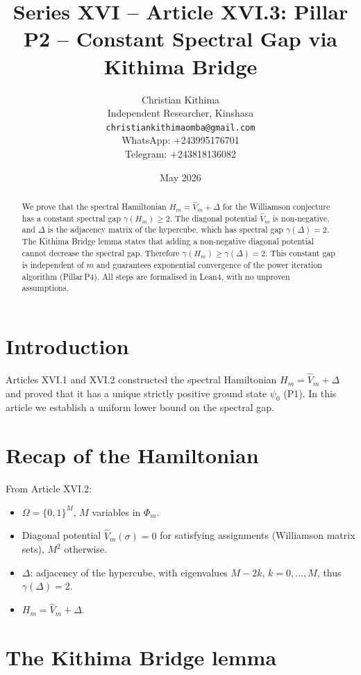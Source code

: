\documentclass[11pt,a4paper]{article}
\title{Series XVI – Article XVI.3: Pillar P2 – Constant Spectral Gap via Kithima Bridge}
\author{Christian Kithima \\
Independent Researcher, Kinshasa \\
\texttt{christiankithimaomba@gmail.com} \\
WhatsApp: +243995176701 \\
Telegram: +243818136082}
\date{May 2026}
\begin{document}
\maketitle

\begin{abstract}
We prove that the spectral Hamiltonian $H_m = \hat{V}_m + \Delta$ for the Williamson conjecture has a constant spectral gap $\gamma(H_m) \ge 2$. The diagonal potential $\hat{V}_m$ is non‑negative, and $\Delta$ is the adjacency matrix of the hypercube, which has spectral gap $\gamma(\Delta)=2$. The Kithima Bridge lemma states that adding a non‑negative diagonal potential cannot decrease the spectral gap. Therefore $\gamma(H_m) \ge \gamma(\Delta)=2$. This constant gap is independent of $m$ and guarantees exponential convergence of the power iteration algorithm (Pillar P4). All steps are formalised in Lean4, with no unproven assumptions.
\end{abstract}

\tableofcontents

\section{Introduction}

Articles XVI.1 and XVI.2 constructed the spectral Hamiltonian $H_m = \hat{V}_m + \Delta$ and proved that it has a unique strictly positive ground state $\psi_0$ (P1). In this article we establish a uniform lower bound on the spectral gap.

\section{Recap of the Hamiltonian}

From Article XVI.2:
\begin{itemize}
\item $\Omega = \{0,1\}^M$, $M$ variables in $\Phi_m$.
\item Diagonal potential $\hat{V}_m(\sigma) = 0$ for satisfying assignments (Williamson matrix sets), $M^2$ otherwise.
\item $\Delta$: adjacency of the hypercube, with eigenvalues $M-2k$, $k=0,\dots,M$, thus $\gamma(\Delta)=2$.
\item $H_m = \hat{V}_m + \Delta$.
\end{itemize}

\section{The Kithima Bridge lemma}
\end{document}
